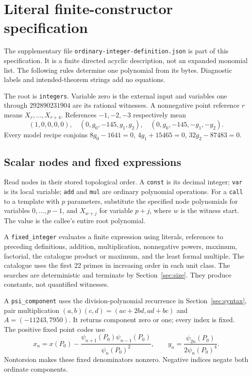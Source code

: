 \documentclass[11pt]{article}
\theoremstyle{definition}
\theoremstyle{remark}
\begin{document}
\section{Literal finite-constructor specification}\label{app:literal}
The supplementary file \nolinkurl{ordinary-integer-definition.json}
is part of this specification. It is a finite directed acyclic description,
not an expanded monomial list. The following rules determine one polynomial
from its bytes. Diagnostic labels and intended-theorem strings add no equations.

The root is \texttt{integers}. Variable zero is the external input and
variables one through $292890231904$ are its rational witnesses.
A nonnegative point reference $r$ means $X_r,\ldots,X_{r+4}$.
References $-1,-2,-3$ respectively mean
\[
 (1,0,0,0,0),\quad(0,g_0,-145,g_1,g_2),\quad
                      (0,g_0,-145,-g_1,-g_2).
\]
Every model recipe conjoins
$8g_0-1641=0$, $4g_1+15465=0$, $32g_2-87483=0$.

\subsection{Scalar nodes and fixed expressions}
Read nodes in their stored topological order.
A \texttt{const} is its decimal integer; \texttt{var} is its local variable;
\texttt{add} and \texttt{mul} are ordinary polynomial operations.
For a \texttt{call} to a template with $p$ parameters, substitute the
specified node polynomials for variables $0,\ldots,p-1$, and $X_{w+j}$
for variable $p+j$, where $w$ is the witness start. The value is the
callee's entire root polynomial.

A \texttt{fixed\_integer} evaluates a finite expression using literals,
references to preceding definitions, addition, multiplication,
nonnegative powers, maximum, factorial, the catalogue product or maximum,
and the least formal multiple. The catalogue uses the first 22 primes
in increasing order in each unit class. The searches are deterministic
and terminate by Section~\ref{sec:size}. They produce constants, not
quantified witnesses.

A \texttt{psi\_component} uses the division-polynomial recurrence in
Section~\ref{sec:syntax}, pair multiplication
$(a,b)(c,d)=(ac+2bd,ad+bc)$ and $A=(-11243,7950)$.
It returns component zero or one; every index is fixed.
The positive fixed point codes use
\[
 x_n=x(P_0)-\frac{\psi_{n+1}(P_0)\psi_{n-1}(P_0)}{\psi_n(P_0)^2},
 \qquad y_n=\frac{\psi_{2n}(P_0)}{2\psi_n(P_0)^4}.
\]
Nontorsion makes these fixed denominators nonzero.
Negative indices negate both ordinate components.
\end{document}

